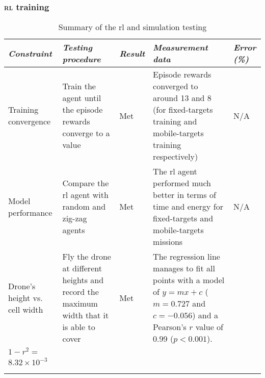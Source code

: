 \documentclass[../main.tex]{subfiles}
\begin{document}
\subsubsection{\textsc{rl} training}

\begin{table}[H]
    \centering
    \caption{Summary of the \gls{rl} and simulation testing}
    \label{tab:rl-testing-summary}
    \begin{tabularx}{\textwidth}{ X X l X l }
        \toprule
        \textit{Constraint} 
            & \textit{Testing procedure} 
                & \textit{Result}
        & \textit{Measurement data} 
            & \textit{Error (\%)} \\

        \midrule
        
        
        \raggedright Training convergence    
            & Train the agent until the episode rewards converge to a
            value
        & Met
        & Episode rewards converged to around 13 and 8 (for fixed-targets training
        and mobile-targets training respectively)
        & N/A \\
        \addlinespace

        \raggedright Model performance
        & Compare the \gls{rl} agent with random and zig-zag agents
        & Met
        & The \gls{rl} agent performed much better in terms of time
        and energy for fixed-targets and mobile-targets missions
        & N/A \\
        \addlinespace

        \raggedright Drone's height vs. cell width
        & Fly the drone at different heights and record the maximum
        width that it is able to cover
        & Met
        & The regression line manages to fit all points with a model
        of $y=mx+c$ ($m=0.727$ and $c=-0.056$) and a
        Pearson's $r$ value of 0.99 ($p < 0.001$).
        & 
        \begin{tabular}{l}
            \\
            $1-r^2 =$ \\
            $8.32\times 10^{-3}$ \\
        \end{tabular}
        \\
        \addlinespace

        \bottomrule		
    \end{tabularx}
\end{table}
\end{document}
